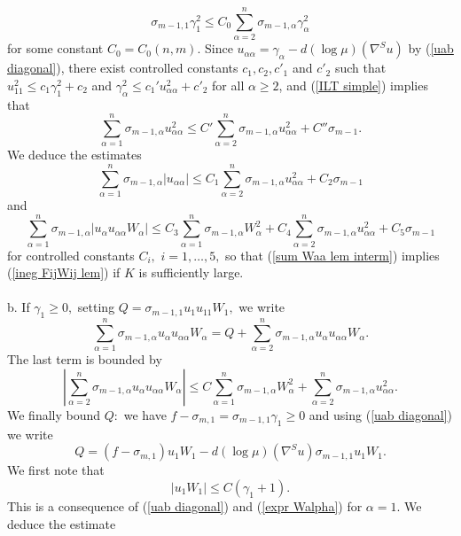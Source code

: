 \documentclass[10pt,reqno,oneside]{amsart}
\theoremstyle{definition}
\theoremstyle{remark}
\begin{document}
\begin{equation}\label{ILT simple}
\sigma_{m-1,1}\gamma_1^2\leq C_0\sum_{\alpha=2}^n\sigma_{m-1,\alpha}\gamma_{\alpha}^2
\end{equation}
for some constant $C_0=C_0(n,m).$ Since $u_{\alpha\alpha}=\gamma_\alpha-d(\log\mu)(\nabla^Su)$ by (\ref{uab diagonal}), there exist controlled constants $c_1,c_2,c'_1$ and $c'_2$ such that $u_{11}^2\leq c_1\gamma_1^2+c_2$ and $\gamma_\alpha^2\leq c_1'u_{\alpha\alpha}^2+c'_2$ for all $\alpha\geq 2$,  and (\ref{ILT simple}) implies that
$$\sum_{\alpha=1}^n\sigma_{m-1,\alpha}u_{\alpha\alpha}^2\leq C'\sum_{\alpha=2}^n\sigma_{m-1,\alpha}u_{\alpha\alpha}^2+C''\sigma_{m-1}.$$
We deduce the estimates
$$\sum_{\alpha=1}^n\sigma_{m-1,\alpha}|u_{\alpha\alpha}|\leq C_1\sum_{\alpha=2}^n\sigma_{m-1,\alpha}u_{\alpha\alpha}^2+C_2\sigma_{m-1}$$
and 
$$\sum_{\alpha=1}^n\sigma_{m-1,\alpha}|u_{\alpha}u_{\alpha\alpha}W_\alpha|\leq C_3 \sum_{\alpha=1}^n\sigma_{m-1,\alpha}W_\alpha^2+C_4\sum_{\alpha=2}^n\sigma_{m-1,\alpha}u_{\alpha\alpha}^2+C_5\sigma_{m-1}$$
for controlled constants $C_i,$ $i=1,\ldots,5,$ so that (\ref{sum Waa lem interm}) implies (\ref{ineg FijWij lem}) if $K$ is sufficiently large.
\\
\\b. If $\gamma_1\geq 0,$ setting $Q=\sigma_{m-1,1}u_1u_{11}W_1,$ we write
\begin{equation}\label{est C2b eqn est Q 1}
\sum_{\alpha=1}^n\sigma_{m-1,\alpha}u_\alpha u_{\alpha\alpha}W_{\alpha}=Q+\sum_{\alpha=2}^n\sigma_{m-1,\alpha}u_\alpha u_{\alpha\alpha}W_{\alpha}.
\end{equation}
The last term is bounded by
\begin{equation}\label{est C2b eqn est Q 2}
\left|\sum_{\alpha=2}^n\sigma_{m-1,\alpha}u_\alpha u_{\alpha\alpha}W_{\alpha}\right|\leq C\sum_{\alpha=1}^n\sigma_{m-1,\alpha}W_{\alpha}^2+\sum_{\alpha=2}^n\sigma_{m-1,\alpha}u_{\alpha\alpha}^2.
\end{equation}
We finally bound $Q:$ we have $f-\sigma_{m,1}=\sigma_{m-1,1}\gamma_1\geq 0$ and using (\ref{uab diagonal}) we write
\begin{equation}\label{eqn Q 1}
Q=(f-\sigma_{m,1})u_1W_1-d(\log\mu)(\nabla^Su)\sigma_{m-1,1}u_1W_1.
\end{equation}
We first note that
\begin{equation}\label{eqn Q 2}
|u_1W_1|\leq C(\gamma_1+1).
\end{equation}
This is a consequence of (\ref{uab diagonal}) and (\ref{expr Walpha}) for $\alpha=1$. We deduce the estimate
\end{document}
